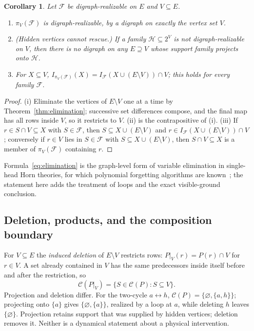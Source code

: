 \documentclass[11pt,a4paper]{article}
\theoremstyle{plain}
\newtheorem{corollary}[theorem]{Corollary}
\theoremstyle{definition}
\theoremstyle{remark}
\newcommand{\cC}{\mathcal C}
\newcommand{\cF}{\mathcal F}
\newcommand{\cH}{\mathcal H}
\newcommand{\Int}{I_{\cF}}
\newcommand{\pw}[1]{2^{#1}}
\begin{document}
\begin{corollary}\label{cor:projection}
Let $\cF$ be digraph-realizable on $E$ and $V\subseteq E$.
\begin{enumerate}[label=(\roman*)]
\item $\pi_V(\cF)$ is digraph-realizable, by a digraph on exactly the vertex set $V$.
\item (Hidden vertices cannot rescue.) If a family $\cH\subseteq\pw{V}$ is not digraph-realizable on $V$, then there is no digraph on any $E\supseteq V$ whose support family projects onto $\cH$.
\item For $X\subseteq V$, $I_{\pi_V(\cF)}(X)=\Int(X\cup(E\setminus V))\cap V$; this holds for every family $\cF$.
\end{enumerate}
\end{corollary}

\begin{proof}
(i) Eliminate the vertices of $E\setminus V$ one at a time by Theorem~\ref{thm:elimination}; successive set differences compose, and the final map has all rows inside $V$, so it restricts to $V$. (ii) is the contrapositive of (i). (iii) If $r\in S\cap V\subseteq X$ with $S\in\cF$, then $S\subseteq X\cup(E\setminus V)$ and $r\in\Int(X\cup(E\setminus V))\cap V$; conversely if $r\in V$ lies in $S\in\cF$ with $S\subseteq X\cup(E\setminus V)$, then $S\cap V\subseteq X$ is a member of $\pi_V(\cF)$ containing $r$.
\end{proof}

Formula~\eqref{eq:elimination} is the graph-level form of variable elimination in single-head Horn theories, for which polynomial forgetting algorithms are known~\cite[Section~5.7]{liberatore2020common}; the statement here adds the treatment of loops and the exact visible-ground conclusion.

\subsection{Deletion, products, and the composition boundary}

For $V\subseteq E$ the \emph{induced deletion} of $E\setminus V$ restricts rows: $P|_V(r)=P(r)\cap V$ for $r\in V$. A set already contained in $V$ has the same predecessors inside itself before and after the restriction, so
\begin{equation}\label{eq:deletion}
 \cC(P|_V)=\{S\in\cC(P): S\subseteq V\}.
\end{equation}
Projection and deletion differ. For the two-cycle $a\leftrightarrow h$, $\cC(P)=\{\varnothing,\{a,h\}\}$; projecting onto $\{a\}$ gives $\{\varnothing,\{a\}\}$, realized by a loop at $a$, while deleting $h$ leaves $\{\varnothing\}$. Projection retains support that was supplied by hidden vertices; deletion removes it. Neither is a dynamical statement about a physical intervention.
\end{document}
